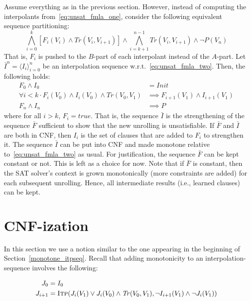 \documentclass{article}
\newcommand{\itp}{\textsc{Itp}}
\newcommand{\Tr}{\mathit{Tr}}
\newcommand{\Init}{\mathit{Init}}
\begin{document}
Assume everything as in the previous section. However, instead of
computing the interpolants from~\eqref{eq:unsat_fmla_one}, consider
the following equivalent sequence partitioning:
\begin{equation}
  \label{eq:unsat_fmla_two}
  \bigwedge_{i=0}^{k}[F_i(V_i) \land \Tr(V_i,V_{i+1})] \land
  \bigwedge_{i=k+1}^{n-1} \Tr(V_i,V_{i+1})\land\neg P(V_n)
\end{equation}
That is, $F_i$ is pushed to the $B$-part of each interpolant instead
of the $A$-part. Let $\bar{I}^n = \langle I_i \rangle_{i=0}^n$ be an
interpolation sequence w.r.t.~\eqref{eq:unsat_fmla_two}. Then, the
following holds:
\begin{align}
  F_0 \land I_0 &= \Init\\
  \forall i < k \cdot F_i(V_0) \land I_i(V_0) \land \Tr(V_0, V_1)
  &\implies F_{i+1}(V_1) \land I_{i+1}(V_1)\\
  F_n \land I_n &\implies P
\end{align}
where for all $i > k$, $F_i = true$. That is, the sequence $\bar{I}$
is the strengthening of the sequence $\bar{F}$ sufficient to show that
the new unrolling is unsatisfiable. If $\bar{F}$ and $\bar{I}$ are
both in CNF, then $I_i$ is the set of clauses that are added to $F_i$
to strengthen it. The sequence $\bar{I}$ can be put into CNF and made
monotone relative to~\eqref{eq:unsat_fmla_two} as usual. For
justification, the sequence $\bar{F}$ can be kept constant or
not. This is left as a choice for now. Note that if $\bar{F}$ is
constant, then the SAT solver's context is grown monotonically (more
constraints are added) for each subsequent unrolling. Hence, all
intermediate results (i.e., learned clauses) can be kept.

\section{CNF-ization}

In this section we use a notion similar to the one appearing in the beginning of Section~\ref{monotone_itpseq}. Recall that adding monotonicity to an interpolation-sequence involves the following:

\begin{align}
  J_0 &= I_0\\
  J_{i+1} &= \itp (J_i(V_1) \lor J_i(V_0) \land \Tr(V_0,V_1),
  \neg I_{i+1}(V_1) \land \neg J_i(V_1))
\end{align}
\end{document}

